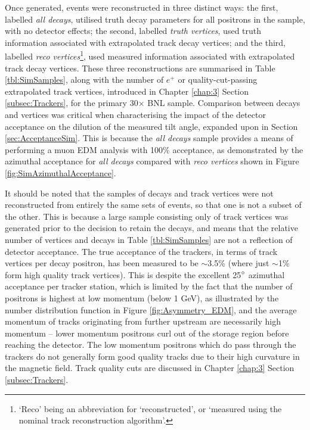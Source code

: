 Once generated, events were reconstructed in three distinct ways: the first, labelled \textit{all decays}, utilised truth decay parameters for all positrons in the sample, with no detector effects; the second, labelled \textit{truth vertices}, used truth information associated with extrapolated track decay vertices; and the third, labelled \textit{reco vertices}\footnote{`Reco' being an abbreviation for `reconstructed', or `measured using the nominal track reconstruction algorithm'.}, used measured information associated with extrapolated track decay vertices. These three reconstructions are summarised in Table \ref{tbl:SimSamples}, along with the number of $e^{+}$ or quality-cut-passing extrapolated track vertices, introduced in Chapter \ref{chap:3} Section \ref{subsec:Trackers}, for the primary 30$\times$ BNL sample. Comparison between decays and vertices was critical when characterising the impact of the detector acceptance on the dilution of the measured tilt angle, expanded upon in Section \ref{sec:AcceptanceSim}. This is because the \textit{all decays} sample provides a means of performing a muon EDM analysis with 100\% acceptance, as demonstrated by the azimuthal acceptance for \textit{all decays} compared with \textit{reco vertices} shown in Figure \ref{fig:SimAzimuthalAcceptance}. 

It should be noted that the samples of decays and track vertices were not reconstructed from entirely the same sets of events, so that one is not a subset of the other. This is because a large sample consisting only of track vertices was generated prior to the decision to retain the decays, and means that the relative number of vertices and decays in Table \ref{tbl:SimSamples} are not a reflection of detector acceptance. The true acceptance of the trackers, in terms of track vertices per decay positron, has been measured to be $\sim$3.5\% (where just $\sim$1\% form high quality track vertices). This is despite the excellent 25$\degree$ azimuthal acceptance per tracker station, which is limited by the fact that the number of positrons is highest at low momentum (below 1 GeV), as illustrated by the number distribution function in Figure \ref{fig:Asymmetry_EDM}, and the average momentum of tracks originating from further upstream are necessarily high momentum -- lower momentum positrons curl out of the storage region before reaching the detector. The low momentum positrons which do pass through the trackers do not generally form good quality tracks due to their high curvature in the magnetic field. Track quality cuts are discussed in Chapter \ref{chap:3} Section \ref{subsec:Trackers}.

